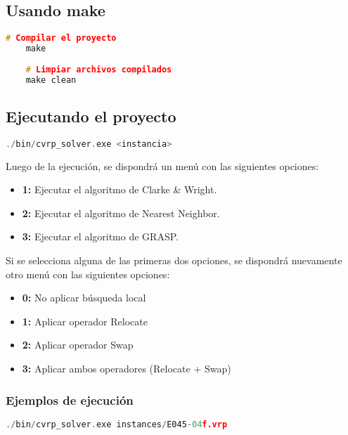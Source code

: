 \documentclass[a4paper,12pt]{article}
\begin{document}
\subsection{Usando make}
\begin{lstlisting}[language=C++, basicstyle=\ttfamily\small, keywordstyle=\color{blue}]
    # Compilar el proyecto
    make
    
    # Limpiar archivos compilados
    make clean
\end{lstlisting}

\subsection{Ejecutando el proyecto}
\begin{lstlisting}[language=C++, basicstyle=\ttfamily\small, keywordstyle=\color{blue}]
    ./bin/cvrp_solver.exe <instancia>
\end{lstlisting}

Luego de la ejecución, se dispondrá un menú con las siguientes opciones:
\begin{itemize}
    \item \textbf{1:} Ejecutar el algoritmo de Clarke \& Wright.
    \item \textbf{2:} Ejecutar el algoritmo de Nearest Neighbor.
    \item \textbf{3:} Ejecutar el algoritmo de GRASP.
\end{itemize}

Si se selecciona alguna de las primeras dos opciones, se dispondrá nuevamente otro menú con las siguientes opciones:
\begin{itemize}
        \item \textbf{0:} No aplicar búsqueda local
        \item \textbf{1:} Aplicar operador Relocate
        \item \textbf{2:} Aplicar operador Swap  
        \item \textbf{3:} Aplicar ambos operadores (Relocate + Swap)
\end{itemize}

\subsubsection{Ejemplos de ejecución}
\begin{lstlisting}[language=C++, basicstyle=\ttfamily\small, keywordstyle=\color{blue}]
    ./bin/cvrp_solver.exe instances/E045-04f.vrp
\end{lstlisting}
\end{document}
